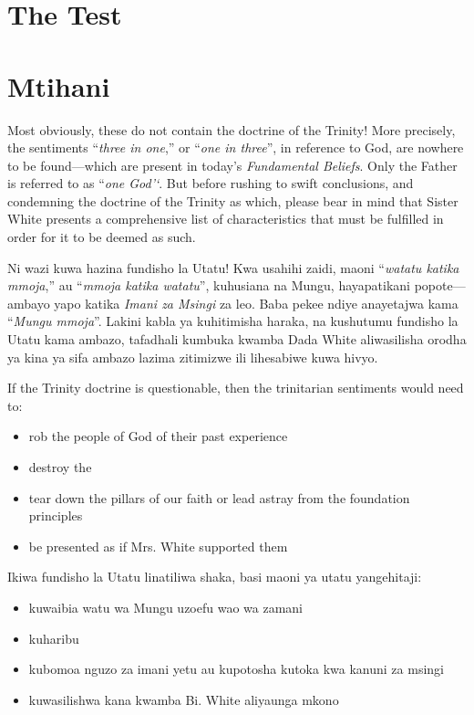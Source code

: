 \section*{The Test}


\section*{Mtihani}


Most obviously, these  do not contain the doctrine of the Trinity! More precisely, the sentiments “\textit{three in one},” or “\textit{one in three}”, in reference to God, are nowhere to be found—which are present in today’s \textit{Fundamental Beliefs}. Only the Father is referred to as “\textit{one God’‘}. But before rushing to swift conclusions, and condemning the doctrine of the Trinity as which, please bear in mind that Sister White presents a comprehensive list of characteristics that must be fulfilled in order for it to be deemed as such.


Ni wazi kuwa  hazina fundisho la Utatu! Kwa usahihi zaidi, maoni “\textit{watatu katika mmoja},” au “\textit{mmoja katika watatu}”, kuhusiana na Mungu, hayapatikani popote—ambayo yapo katika \textit{Imani za Msingi} za leo. Baba pekee ndiye anayetajwa kama “\textit{Mungu mmoja}”. Lakini kabla ya kuhitimisha haraka, na kushutumu fundisho la Utatu kama ambazo, tafadhali kumbuka kwamba Dada White aliwasilisha orodha ya kina ya sifa ambazo lazima zitimizwe ili lihesabiwe kuwa hivyo.


If the Trinity doctrine is questionable, then the trinitarian sentiments would need to:
\begin{itemize}
    \item rob the people of God of their past experience
    \item destroy the 
    \item tear down the pillars of our faith or lead astray from the foundation principles
    \item be presented as if Mrs. White supported them
\end{itemize}


Ikiwa fundisho la Utatu linatiliwa shaka, basi maoni ya utatu yangehitaji:
\begin{itemize}
    \item kuwaibia watu wa Mungu uzoefu wao wa zamani
    \item kuharibu 
    \item kubomoa nguzo za imani yetu au kupotosha kutoka kwa kanuni za msingi
    \item kuwasilishwa kana kwamba Bi. White aliyaunga mkono
\end{itemize}


